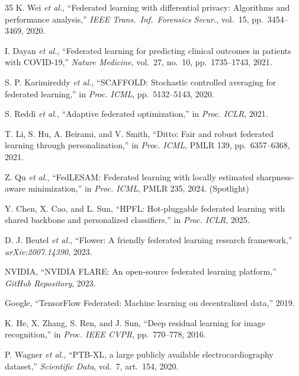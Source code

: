 \documentclass[conference,letterpaper]{IEEEtran}
\begin{document}
\begin{thebibliography}{35}
K. Wei \textit{et al.}, ``Federated learning with differential privacy: Algorithms and performance analysis,'' \textit{IEEE Trans.~Inf.~Forensics Secur.}, vol.~15, pp.~3454--3469, 2020.

I. Dayan \textit{et al.}, ``Federated learning for predicting clinical outcomes in patients with COVID-19,'' \textit{Nature Medicine}, vol.~27, no.~10, pp.~1735--1743, 2021.

S. P. Karimireddy \textit{et al.}, ``SCAFFOLD: Stochastic controlled averaging for federated learning,'' in \textit{Proc. ICML}, pp.~5132--5143, 2020.

S. Reddi \textit{et al.}, ``Adaptive federated optimization,'' in \textit{Proc. ICLR}, 2021.

T. Li, S. Hu, A. Beirami, and V. Smith, ``Ditto: Fair and robust federated learning through personalization,'' in \textit{Proc. ICML}, PMLR 139, pp.~6357--6368, 2021.

Z. Qu \textit{et al.}, ``FedLESAM: Federated learning with locally estimated sharpness-aware minimization,'' in \textit{Proc. ICML}, PMLR 235, 2024. (Spotlight)

Y. Chen, X. Cao, and L. Sun, ``HPFL: Hot-pluggable federated learning with shared backbone and personalized classifiers,'' in \textit{Proc. ICLR}, 2025.

D. J. Beutel \textit{et al.}, ``Flower: A friendly federated learning research framework,'' \textit{arXiv:2007.14390}, 2023.

NVIDIA, ``NVIDIA FLARE: An open-source federated learning platform,'' \textit{GitHub Repository}, 2023.

Google, ``TensorFlow Federated: Machine learning on decentralized data,'' 2019.

K. He, X. Zhang, S. Ren, and J. Sun, ``Deep residual learning for image recognition,'' in \textit{Proc. IEEE CVPR}, pp.~770--778, 2016.

P. Wagner \textit{et al.}, ``PTB-XL, a large publicly available electrocardiography dataset,'' \textit{Scientific Data}, vol.~7, art.~154, 2020.

\end{thebibliography}
\end{document}

